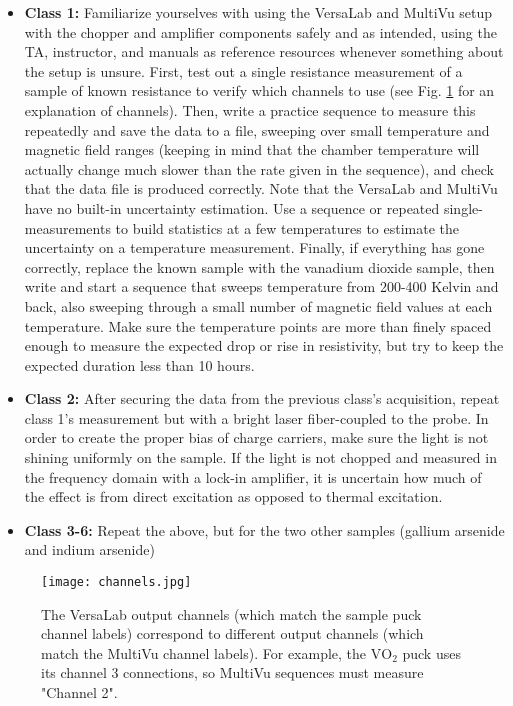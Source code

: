 \documentclass{article}
\begin{document}
\begin{itemize}
    \item \textbf{Class 1:} Familiarize yourselves with using the VersaLab and MultiVu setup with the chopper and amplifier components safely and as intended, using the TA, instructor, and manuals as reference resources whenever something about the setup is unsure. First, test out a single resistance measurement of a sample of known resistance to verify which channels to use (see Fig. \ref{fig:channels} for an explanation of channels). Then, write a practice sequence to measure this repeatedly and save the data to a file, sweeping over small temperature and magnetic field ranges (keeping in mind that the chamber temperature will actually change much slower than the rate given in the sequence), and check that the data file is produced correctly. Note that the VersaLab and MultiVu have no built-in uncertainty estimation. Use a sequence or repeated single-measurements to build statistics at a few temperatures to estimate the uncertainty on a temperature measurement. Finally, if everything has gone correctly, replace the known sample with the vanadium dioxide sample, then write and start a sequence that sweeps temperature from 200-400 Kelvin and back, also sweeping through a small number of magnetic field values at each temperature. Make sure the temperature points are more than finely spaced enough to measure the expected drop or rise in resistivity, but try to keep the expected duration less than 10 hours.
    \item \textbf{Class 2:} After securing the data from the previous class's acquisition, repeat class 1's measurement but with a bright laser fiber-coupled to the probe. In order to create the proper bias of charge carriers, make sure the light is not shining uniformly on the sample. If the light is not chopped and measured in the frequency domain with a lock-in amplifier, it is uncertain how much of the effect is from direct excitation as opposed to thermal excitation.
    \item \textbf{Class 3-6:} Repeat the above, but for the two other samples (gallium arsenide and indium arsenide)
\end{itemize}

\begin{figure}
    \centering
    \texttt{[image: channels.jpg]}
    \caption{The VersaLab output channels (which match the sample puck channel labels) correspond to different output channels (which match the MultiVu channel labels). For example, the $\mathrm{VO_2}$ puck uses its channel 3 connections, so MultiVu sequences must measure "Channel 2".}
    \label{fig:channels}
\end{figure}
\end{document}
